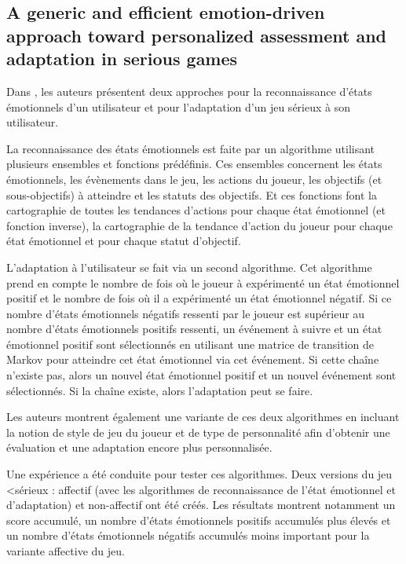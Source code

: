 \documentclass{article}
\begin{document}
    \subsection{A generic and efficient emotion-driven approach toward personalized assessment and adaptation in serious games}
        Dans \cite{Mostefai_et_al._2019}, les auteurs présentent deux approches pour la reconnaissance d'états émotionnels d'un utilisateur et pour l'adaptation d'un jeu sérieux à son utilisateur.\par
        La reconnaissance des états émotionnels est faite par un algorithme utilisant plusieurs ensembles et fonctions prédéfinis. Ces ensembles concernent les états émotionnels, les évènements dans le jeu, les actions du joueur, les objectifs (et sous-objectifs) à atteindre et les statuts des objectifs. 
        Et ces fonctions font la cartographie de toutes les tendances d'actions pour chaque état émotionnel (et fonction inverse), la cartographie de la tendance d'action du joueur pour chaque état émotionnel et pour chaque statut d'objectif.\par
        L'adaptation à l'utilisateur se fait via un second algorithme. 
        Cet algorithme prend en compte le nombre de fois où le joueur à expérimenté un état émotionnel positif et le nombre de fois où il a expérimenté un état émotionnel négatif. 
        Si ce nombre d'états émotionnels négatifs ressenti par le joueur est supérieur au nombre d'états émotionnels positifs ressenti, un événement à suivre et un état émotionnel positif sont sélectionnés en utilisant une matrice de transition de Markov pour atteindre cet état émotionnel via cet événement. 
        Si cette chaîne n'existe pas, alors un nouvel état émotionnel positif et un nouvel événement sont sélectionnés. Si la chaîne existe, alors l'adaptation peut se faire.\par
        Les auteurs montrent également une variante de ces deux algorithmes en incluant la notion de style de jeu du joueur et de type de personnalité afin d'obtenir une évaluation et une adaptation encore plus personnalisée.\par
        Une expérience a été conduite pour tester ces algorithmes. Deux versions du jeu <sérieux : affectif (avec les algorithmes de reconnaissance de l'état émotionnel et d'adaptation) et non-affectif ont été créés. Les résultats montrent notamment un score accumulé, un nombre d'états émotionnels positifs accumulés plus élevés et un nombre d'états émotionnels négatifs accumulés moins important pour la variante affective du jeu.
\end{document}
